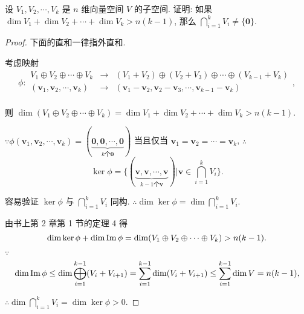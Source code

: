 \documentclass{ctexart}
\begin{document}
\addtocounter{exercise}{2}
\begin{exercise}%
    设 $V_1,V_2,\cdots,V_k$ 是 $n$ 维向量空间 $V$ 的子空间. 证明: 如果 $\dim V_1+\dim V_2+\cdots+\dim V_k>n(k-1)$, 那么 $\bigcap\limits_{i=1}^kV_i\neq\{\boldsymbol{0}\}$.
\end{exercise}
\begin{proof}
    下面的直和一律指外直和.

    考虑映射
    \[\phi:\begin{array}{rcl}
        V_1\oplus V_2\oplus\cdots\oplus V_k & \to & (V_1+V_2)\oplus(V_2+V_3)\oplus\cdots\oplus(V_{k-1}+V_k) \\
        (\boldsymbol{v}_1,\boldsymbol{v}_2,\cdots,\boldsymbol{v}_k) & \to & (\boldsymbol{v}_1-\boldsymbol{v}_2,\boldsymbol{v}_2-\boldsymbol{v}_3,\cdots,\boldsymbol{v}_{k-1}-\boldsymbol{v}_k) \\
    \end{array},\]

    则 $\dim(V_1\oplus V_2\oplus\cdots\oplus V_k)=\dim V_1+\dim V_2+\cdots+\dim V_k>n(k-1)$.

    $\because\phi(\boldsymbol{v}_1,\boldsymbol{v}_2,\cdots,\boldsymbol{v}_k)=(\underbrace{\boldsymbol{0},\boldsymbol{0},\cdots,\boldsymbol{0}}_{k\text{个}\boldsymbol{0}})$ 当且仅当 $\boldsymbol{v}_1=\boldsymbol{v}_2=\cdots=\boldsymbol{v}_k$, $\therefore$
    \[\ker\phi=\bigg\{(\underbrace{\boldsymbol{v},\boldsymbol{v},\cdots,\boldsymbol{v}}_{k-1\text{个}\boldsymbol{v}})\bigg|\boldsymbol{v}\in\bigcap\limits_{i=1}^kV_i\bigg\}.\]

    容易验证 $\ker\phi$ 与 $\bigcap\limits_{i=1}^kV_i$ 同构. $\therefore\dim\ker\phi=\dim\bigcap\limits_{i=1}^kV_i$.

    由书上第 2 章第 1 节的定理 4 得
    \[\dim\ker\phi+\dim\operatorname{Im} \phi=\dim(V_1\oplus V_2\oplus\cdots\oplus V_k)>n(k-1).\]

    $\because$
    \[\dim\operatorname{Im} \phi\leq\dim\bigoplus\limits_{i=1}^{k-1}(V_i+V_{i+1})=\sum\limits_{i=1}^{k-1}\dim(V_i+V_{i+1})\leq\sum\limits_{i=1}^{k-1}\dim V=n(k-1),\]

    $\therefore\dim\bigcap\limits_{i=1}^kV_i=\dim\ker\phi>0$.
\end{proof}
\end{document}
